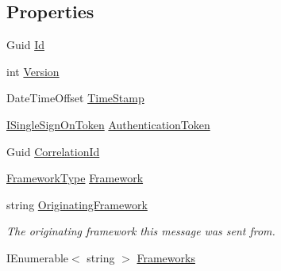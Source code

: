 \subsection*{Properties}
\begin{DoxyCompactItemize}
\item 
Guid \hyperlink{classCqrs_1_1Tests_1_1Substitutes_1_1TestAggregateCreated_a04a32dd7189e698ba295cbfcf7e0d329}{Id}
\item 
int \hyperlink{classCqrs_1_1Tests_1_1Substitutes_1_1TestAggregateCreated_ab0ea0893cbb96c0f88237a489600d8cc}{Version}
\item 
Date\+Time\+Offset \hyperlink{classCqrs_1_1Tests_1_1Substitutes_1_1TestAggregateCreated_ab864456a26c4508ad2e071fe9fefa800}{Time\+Stamp}
\item 
\hyperlink{interfaceCqrs_1_1Authentication_1_1ISingleSignOnToken}{I\+Single\+Sign\+On\+Token} \hyperlink{classCqrs_1_1Tests_1_1Substitutes_1_1TestAggregateCreated_a6d3d371ff4be9f42857c04e6ccbcab05}{Authentication\+Token}
\item 
Guid \hyperlink{classCqrs_1_1Tests_1_1Substitutes_1_1TestAggregateCreated_aacb3f1b22d6d793969aaba32978fdef7}{Correlation\+Id}
\item 
\hyperlink{namespaceCqrs_1_1Messages_af06a7e6cd2609043d0f2f5f3419f81e3}{Framework\+Type} \hyperlink{classCqrs_1_1Tests_1_1Substitutes_1_1TestAggregateCreated_abc5d7db43344513944dbc85f1d4cac56}{Framework}
\item 
string \hyperlink{classCqrs_1_1Tests_1_1Substitutes_1_1TestAggregateCreated_aa1eadfaa9c402b0744d178105e3fe7be}{Originating\+Framework}
\begin{DoxyCompactList}\small\item\em The originating framework this message was sent from. \end{DoxyCompactList}\item 
I\+Enumerable$<$ string $>$ \hyperlink{classCqrs_1_1Tests_1_1Substitutes_1_1TestAggregateCreated_a1bfb5599d9298d4c8242e4785a9c2b51}{Frameworks}

\end{DoxyCompactItemize}
